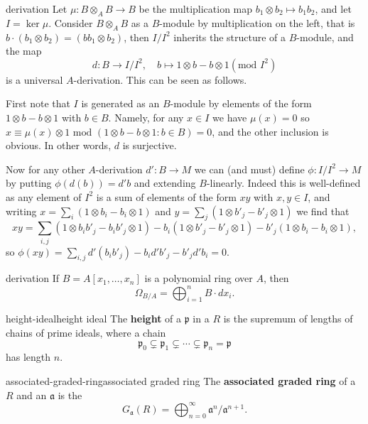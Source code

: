 \begin{example}{derivation}
    Let $\mu : B \otimes_A B \to B$ be the multiplication map $b_1 \otimes b_2 \mapsto b_1 b_2$, and let $I = \ker \mu$. Consider $B \otimes_A B$ as a $B$-module by multiplication on the left, that is $b \cdot (b_1 \otimes b_2) = (bb_1 \otimes b_2)$, then $I/I^2$ inherits the structure of a $B$-module, and the map
    \[ d : B \to I/I^2, \quad b \mapsto 1 \otimes b - b \otimes 1 (\text{mod } I^2) \]
    is a universal $A$-derivation. This can be seen as follows.
    
    First note that $I$ is generated as an $B$-module by elements of the form $1 \otimes b - b \otimes 1$ with $b \in B$. Namely, for any $x \in I$ we have $\mu(x) = 0$ so $x \equiv \mu(x) \otimes 1 \text{ mod } (1 \otimes b - b \otimes 1 : b \in B) = 0$, and the other inclusion is obvious. In other words, $d$ is surjective.
    
    Now for any other $A$-derivation $d' : B \to M$ we can (and must) define $\phi : I/I^2 \to M$ by putting $\phi(d(b)) = d' b$ and extending $B$-linearly. Indeed this is well-defined as any element of $I^2$ is a sum of elements of the form $xy$ with $x, y \in I$, and writing $x = \sum_i (1 \otimes b_i - b_i \otimes 1)$ and $y = \sum_j (1 \otimes b'_j - b'_j \otimes 1)$ we find that
    \[ xy = \sum_{i,j} (1 \otimes b_i b'_j - b_i b'_j \otimes 1) - b_i (1 \otimes b'_j - b'_j \otimes 1) - b'_j (1 \otimes b_i - b_i \otimes 1) , \]
    so $\phi(xy) = \sum_{i, j} d'(b_i b'_j) - b_i d' b'_j - b'_j d' b_i = 0$.
\end{example}

\begin{example}{derivation}
    If $B = A[x_1, \ldots, x_n]$ is a polynomial ring over $A$, then
    \[ \Omega_{B/A} = \bigoplus_{i = 1}^{n} B \cdot dx_i . \]
\end{example}

\begin{topic}{height-ideal}{height ideal}
    The \textbf{height} of a  $\mathfrak{p}$ in a  $R$ is the supremum of lengths of chains of prime ideals, where a chain
    \[ \mathfrak{p}_0 \subsetneq \mathfrak{p}_1 \subsetneq \cdots \subsetneq \mathfrak{p}_n = \mathfrak{p} \]
    has length $n$.
\end{topic}

\begin{topic}{associated-graded-ring}{associated graded ring}
    The \textbf{associated graded ring} of a  $R$ and an  $\mathfrak{a}$ is the 
    \[ G_\mathfrak{a}(R) = \bigoplus_{n = 0}^{\infty} \mathfrak{a}^n / \mathfrak{a}^{n + 1} . \]
\end{topic}


